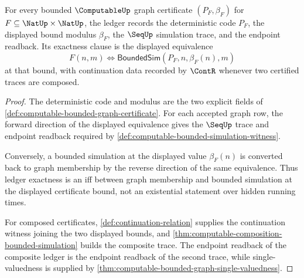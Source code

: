 \begin{theorem}
\label{thm:computable-bounded-graph-ledger-exactness-obligation}
For every bounded $\ComputableUp$ graph certificate $(P_F,\beta_F)$ for $F\subseteq\NatUp\times\NatUp$, the ledger records the deterministic code $P_F$, the displayed bound modulus $\beta_F$, the $\SeqUp$ simulation trace, and the endpoint readback. Its exactness clause is the displayed equivalence
$$
  F(n,m)\Longleftrightarrow
  \mathsf{BoundedSim}(P_F,n,\beta_F(n),m)
$$
at that bound, with continuation data recorded by $\ContR$ whenever two certified traces are composed.
\end{theorem}
\begin{proof}
The deterministic code and modulus are the two explicit fields of \autoref{def:computable-bounded-graph-certificate}. For each accepted graph row, the forward direction of the displayed equivalence gives the $\SeqUp$ trace and endpoint readback required by \autoref{def:computable-bounded-simulation-witness}.

Conversely, a bounded simulation at the displayed value $\beta_F(n)$ is converted back to graph membership by the reverse direction of the same equivalence. Thus ledger exactness is an iff between graph membership and bounded simulation at the displayed certificate bound, not an existential statement over hidden running times.

For composed certificates, \autoref{def:continuation-relation} supplies the continuation witness joining the two displayed bounds, and \autoref{thm:computable-composition-bounded-simulation} builds the composite trace. The endpoint readback of the composite ledger is the endpoint readback of the second trace, while single-valuedness is supplied by \autoref{thm:computable-bounded-graph-single-valuedness}.
\end{proof}

